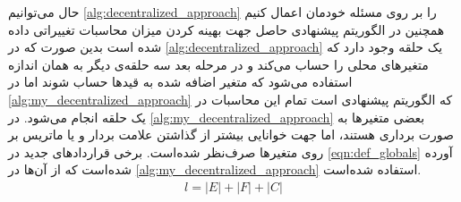 حال می‌توانیم \cref{alg:decentralized_approach} را بر روی مسئله خودمان اعمال کنیم همچنین در الگوریتم پیشنهادی حاصل جهت بهینه کردن میزان محاسبات تغییراتی داده شده است بدین صورت که در \cref{alg:decentralized_approach} یک حلقه‌ وجود دارد که متغیرهای محلی را حساب می‌کند و در مرحله بعد سه حلقه‌ی دیگر به همان اندازه استفاده می‌شود که متغیر اضافه شده به قیدها حساب شوند اما در \cref{alg:my_decentralized_approach} که الگوریتم پیشنهادی است تمام این محاسبات در یک حلقه انجام می‌شود. در \cref{alg:my_decentralized_approach} بعضی متغیرها به صورت برداری هستند، اما جهت خوانایی بیشتر از گذاشتن علامت بردار و یا ماتریس بر روی متغیرها صرف‌نظر شده‌است. برخی قراردادهای جدید در \cref{eqn:def_globals} آورده شده‌است که از آن‌ها در \cref{alg:my_decentralized_approach} استفاده شده‌است.
\begin{subequations}
	\begin{align}
		l = |E| + |F| + |C|
	\end{align}
\end{subequations}
	
